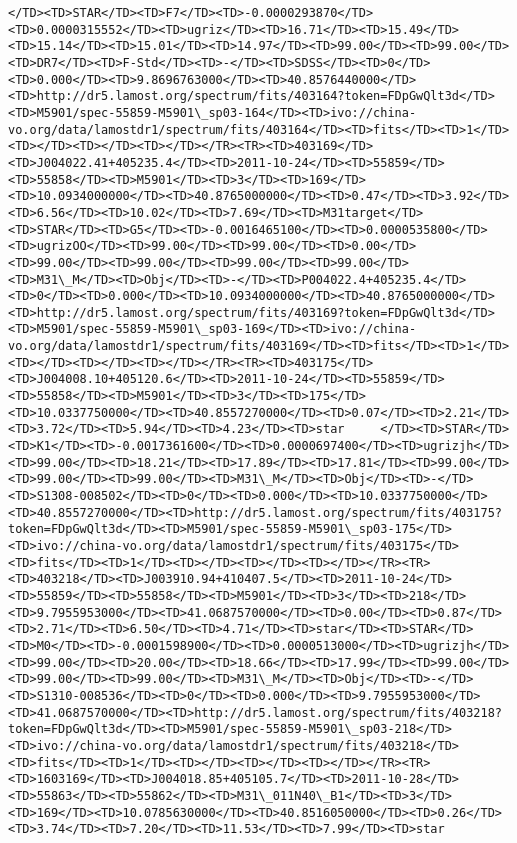 \documentclass[11pt]{article}
\begin{document}
\begin{Verbatim}[commandchars=\\\{\}]
</TD><TD>STAR</TD><TD>F7</TD><TD>-0.0000293870</TD><TD>0.0000315552</TD><TD>ugriz</TD><TD>16.71</TD><TD>15.49</TD><TD>15.14</TD><TD>15.01</TD><TD>14.97</TD><TD>99.00</TD><TD>99.00</TD><TD>DR7</TD><TD>F-Std</TD><TD>-</TD><TD>SDSS</TD><TD>0</TD><TD>0.000</TD><TD>9.8696763000</TD><TD>40.8576440000</TD><TD>http://dr5.lamost.org/spectrum/fits/403164?token=FDpGwQlt3d</TD><TD>M5901/spec-55859-M5901\_sp03-164</TD><TD>ivo://china-vo.org/data/lamostdr1/spectrum/fits/403164</TD><TD>fits</TD><TD>1</TD><TD></TD><TD></TD><TD></TD></TR><TR><TD>403169</TD><TD>J004022.41+405235.4</TD><TD>2011-10-24</TD><TD>55859</TD><TD>55858</TD><TD>M5901</TD><TD>3</TD><TD>169</TD><TD>10.0934000000</TD><TD>40.8765000000</TD><TD>0.47</TD><TD>3.92</TD><TD>6.56</TD><TD>10.02</TD><TD>7.69</TD><TD>M31target</TD><TD>STAR</TD><TD>G5</TD><TD>-0.0016465100</TD><TD>0.0000535800</TD><TD>ugrizOO</TD><TD>99.00</TD><TD>99.00</TD><TD>0.00</TD><TD>99.00</TD><TD>99.00</TD><TD>99.00</TD><TD>99.00</TD><TD>M31\_M</TD><TD>Obj</TD><TD>-</TD><TD>P004022.4+405235.4</TD><TD>0</TD><TD>0.000</TD><TD>10.0934000000</TD><TD>40.8765000000</TD><TD>http://dr5.lamost.org/spectrum/fits/403169?token=FDpGwQlt3d</TD><TD>M5901/spec-55859-M5901\_sp03-169</TD><TD>ivo://china-vo.org/data/lamostdr1/spectrum/fits/403169</TD><TD>fits</TD><TD>1</TD><TD></TD><TD></TD><TD></TD></TR><TR><TD>403175</TD><TD>J004008.10+405120.6</TD><TD>2011-10-24</TD><TD>55859</TD><TD>55858</TD><TD>M5901</TD><TD>3</TD><TD>175</TD><TD>10.0337750000</TD><TD>40.8557270000</TD><TD>0.07</TD><TD>2.21</TD><TD>3.72</TD><TD>5.94</TD><TD>4.23</TD><TD>star     </TD><TD>STAR</TD><TD>K1</TD><TD>-0.0017361600</TD><TD>0.0000697400</TD><TD>ugrizjh</TD><TD>99.00</TD><TD>18.21</TD><TD>17.89</TD><TD>17.81</TD><TD>99.00</TD><TD>99.00</TD><TD>99.00</TD><TD>M31\_M</TD><TD>Obj</TD><TD>-</TD><TD>S1308-008502</TD><TD>0</TD><TD>0.000</TD><TD>10.0337750000</TD><TD>40.8557270000</TD><TD>http://dr5.lamost.org/spectrum/fits/403175?token=FDpGwQlt3d</TD><TD>M5901/spec-55859-M5901\_sp03-175</TD><TD>ivo://china-vo.org/data/lamostdr1/spectrum/fits/403175</TD><TD>fits</TD><TD>1</TD><TD></TD><TD></TD><TD></TD></TR><TR><TD>403218</TD><TD>J003910.94+410407.5</TD><TD>2011-10-24</TD><TD>55859</TD><TD>55858</TD><TD>M5901</TD><TD>3</TD><TD>218</TD><TD>9.7955953000</TD><TD>41.0687570000</TD><TD>0.00</TD><TD>0.87</TD><TD>2.71</TD><TD>6.50</TD><TD>4.71</TD><TD>star</TD><TD>STAR</TD><TD>M0</TD><TD>-0.0001598900</TD><TD>0.0000513000</TD><TD>ugrizjh</TD><TD>99.00</TD><TD>20.00</TD><TD>18.66</TD><TD>17.99</TD><TD>99.00</TD><TD>99.00</TD><TD>99.00</TD><TD>M31\_M</TD><TD>Obj</TD><TD>-</TD><TD>S1310-008536</TD><TD>0</TD><TD>0.000</TD><TD>9.7955953000</TD><TD>41.0687570000</TD><TD>http://dr5.lamost.org/spectrum/fits/403218?token=FDpGwQlt3d</TD><TD>M5901/spec-55859-M5901\_sp03-218</TD><TD>ivo://china-vo.org/data/lamostdr1/spectrum/fits/403218</TD><TD>fits</TD><TD>1</TD><TD></TD><TD></TD><TD></TD></TR><TR><TD>1603169</TD><TD>J004018.85+405105.7</TD><TD>2011-10-28</TD><TD>55863</TD><TD>55862</TD><TD>M31\_011N40\_B1</TD><TD>3</TD><TD>169</TD><TD>10.0785630000</TD><TD>40.8516050000</TD><TD>0.26</TD><TD>3.74</TD><TD>7.20</TD><TD>11.53</TD><TD>7.99</TD><TD>star     
\end{Verbatim}
\end{document}
